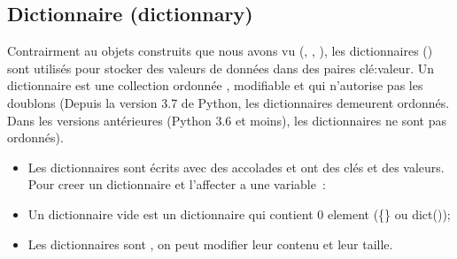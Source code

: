 \documentclass[letterpaper,10pt,french]{sphinxmanual}
\begin{document}
\subsection{Dictionnaire (dictionnary)}
\label{\detokenize{ch7:dictionnaire-dictionnary}}
\sphinxAtStartPar
Contrairment au objets construits que nous avons vu (, , ), les dictionnaires () sont utilisés pour stocker des valeurs de données dans des paires clé:valeur. Un dictionnaire est une collection ordonnée , modifiable et qui n’autorise pas les doublons (Depuis la version 3.7 de Python, les dictionnaires demeurent ordonnés. Dans les versions antérieures (Python 3.6 et moins), les dictionnaires ne sont pas ordonnés).
\begin{itemize}
\item {} 
\sphinxAtStartPar
Les dictionnaires sont écrits avec des accolades et ont des clés et des valeurs.  Pour creer un dictionnaire et l’affecter a une variable :

\end{itemize}

\begin{sphinxVerbatim}[commandchars=\\\{\}]
     
\end{sphinxVerbatim}
\begin{itemize}
\item {} 
\sphinxAtStartPar
Un dictionnaire vide est un dictionnaire qui contient 0 element (\{\} ou dict());

\item {} 
\sphinxAtStartPar
Les dictionnaires sont , on peut modifier leur contenu et leur taille.

\end{itemize}
\end{document}
